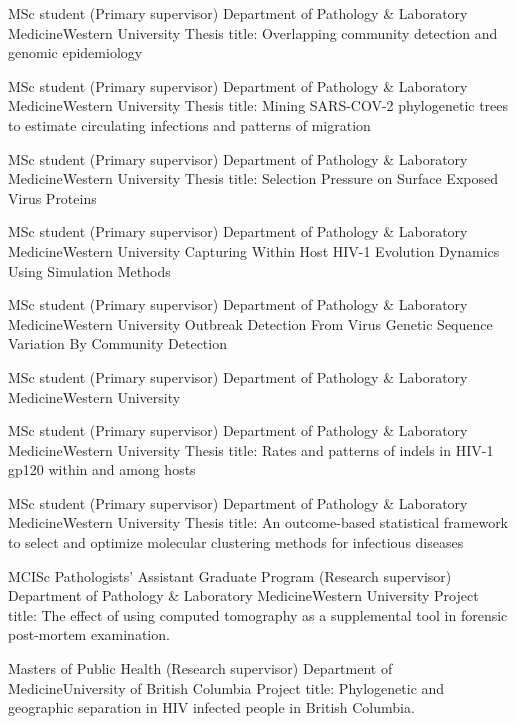 {MSc student (Primary supervisor)}
{Department of Pathology \& Laboratory Medicine}{Western University}
{Thesis title: Overlapping community detection and genomic epidemiology}

{MSc student (Primary supervisor)}
{Department of Pathology \& Laboratory Medicine}{Western University}
{Thesis title: Mining SARS-COV-2 phylogenetic trees to estimate circulating infections and patterns of migration}

{MSc student (Primary supervisor)}
{Department of Pathology \& Laboratory Medicine}{Western University}
{Thesis title: Selection Pressure on Surface Exposed Virus Proteins}

{MSc student (Primary supervisor)}
{Department of Pathology \& Laboratory Medicine}{Western University}
{Capturing Within Host HIV-1 Evolution Dynamics Using Simulation Methods}

{MSc student (Primary supervisor)}
{Department of Pathology \& Laboratory Medicine}{Western University}
{Outbreak Detection From Virus Genetic Sequence Variation By Community Detection}

{MSc student (Primary supervisor)}
{Department of Pathology \& Laboratory Medicine}{Western University}
{}

{MSc student (Primary supervisor)}
{Department of Pathology \& Laboratory Medicine}{Western University}
{Thesis title: Rates and patterns of indels in HIV-1 gp120 within and among hosts}

{MSc student (Primary supervisor)}
{Department of Pathology \& Laboratory Medicine}{Western University}
{Thesis title: An outcome-based statistical framework to select and optimize molecular clustering methods for infectious diseases}

{MCISc Pathologists' Assistant Graduate Program (Research supervisor)}
{Department of Pathology \& Laboratory Medicine}{Western University}
{Project title: The effect of using computed tomography as a supplemental tool in forensic post-mortem examination.}

{Masters of Public Health (Research supervisor)}
{Department of Medicine}{University of British Columbia}
{Project title: Phylogenetic and geographic separation in HIV infected people in British Columbia.}

